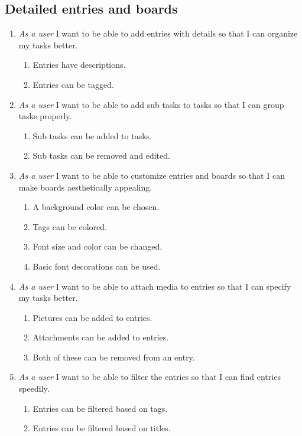 \documentclass{article}
\begin{document}
	\subsection{Detailed entries and boards}

	\begin{enumerate}
		\item \emph{As a user} I want to be able to add entries with details so that I can organize my tasks better.
			\begin{enumerate}
				\item Entries have descriptions.
				\item Entries can be tagged.
			\end{enumerate}

		\item \emph{As a user} I want to be able to add sub tasks to tasks so that I can group tasks properly.
			\begin{enumerate}
				\item Sub tasks can be added to tasks.
				\item Sub tasks can be removed and edited.
			\end{enumerate}
		
		\item \emph{As a user} I want to be able to customize entries and boards so that I can make boards aesthetically appealing.
			\begin{enumerate}
				\item A background color can be chosen.
				\item Tags can be colored.
				\item Font size and color can be changed.
				\item Basic font decorations can be used.
			\end{enumerate}

		\item \emph{As a user} I want to be able to attach media to entries so that I can specify my tasks better.
			\begin{enumerate}
				\item Pictures can be added to entries.
				\item Attachments can be added to entries.
				\item Both of these can be removed from an entry.
			\end{enumerate}

		\item \emph{As a user} I want to be able to filter the entries so that I can find entries speedily.
			\begin{enumerate}
				\item Entries can be filtered based on tags.
				\item Entries can be filtered based on titles.
			\end{enumerate}
	\end{enumerate}
\end{document}
